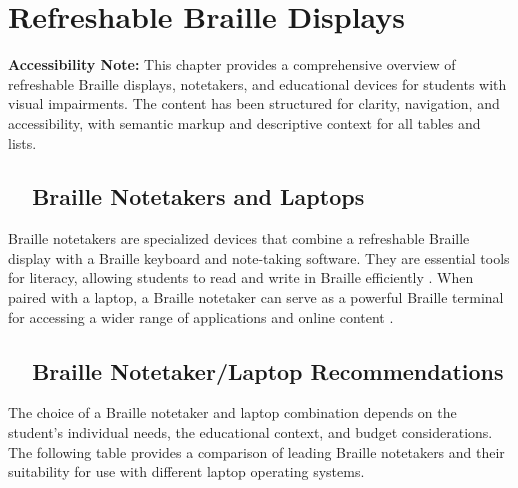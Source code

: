 \chapter{Refreshable Braille Displays}\label{ch3:braille}
\raggedright

\begin{raggedright}
	\textbf{Accessibility Note:} This chapter provides a comprehensive overview of refreshable Braille displays, notetakers, and educational devices for students with visual impairments. The content has been structured for clarity, navigation, and accessibility, with semantic markup and descriptive context for all tables and lists.
\end{raggedright}

\section{~~Braille Notetakers and Laptops}\label{ch3:sec:notetakers-laptops}
Braille notetakers are specialized devices that combine a refreshable Braille display with a Braille keyboard and note-taking software. They are essential tools for literacy, allowing students to read and write in Braille efficiently \supercite{Holbrook2006, Presley2012, PerkinsNoteTaking, TeachingVI}. When paired with a laptop, a Braille notetaker can serve as a powerful Braille terminal for accessing a wider range of applications and online content \supercite{Kelly2011, Day2021}.

\section{~~Braille Notetaker/Laptop Recommendations}\label{ch3:sec:notetaker-laptop-recs}
The choice of a Braille notetaker and laptop combination depends on the student's individual needs, the educational context, and budget considerations. The following table provides a comparison of leading Braille notetakers and their suitability for use with different laptop operating systems.

